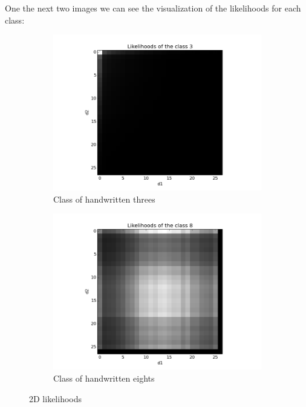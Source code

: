\documentclass{article}
\begin{document}
One the next two images we can see the visualization of the likelihoods for each class:

\begin{figure}[ht]
        \centering
        \begin{subfigure}[b]{0.5\textwidth}
                \includegraphics[width=\textwidth]{../likelihoods3.png}
                \caption{Class of handwritten threes}
        \end{subfigure}%
        \begin{subfigure}[b]{0.5\textwidth}
                \includegraphics[width=\textwidth]{../likelihoods8.png}
                \caption{Class of handwritten eights}
        \end{subfigure}
        \caption{2D likelihoods}
        \label{img4}
\end{figure}
\end{document}
